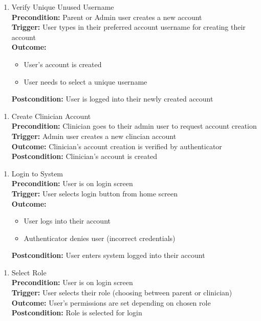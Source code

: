 \documentclass[12pt]{article}
\begin{document}
\begin{enumerate}[label={PUC-}02. ]
  \item Verify Unique Unused Username\\
  \textbf{Precondition: }Parent or Admin user creates a new account\\
  \textbf{Trigger: }User types in their preferred account username for creating their account\\
  \textbf{Outcome: }
  \begin{itemize}
  \item User's account is created
  \item User needs to select a unique username
  \end{itemize}
  \textbf{Postcondition: }User is logged into their newly created account\\
\end{enumerate}

\begin{enumerate}[label={PUC-}03. ]
  \item Create Clinician Account\\
  \textbf{Precondition: }Clinician goes to their admin user to request account creation\\
  \textbf{Trigger: }Admin user creates a new clincian account\\
  \textbf{Outcome: }Clinician's account creation is verified by authenticator\\
  \textbf{Postcondition: }Clinician's account is created\\
\end{enumerate}

\begin{enumerate}[label={PUC-}04. ]
  \item Login to System\\
  \textbf{Precondition: }User is on login screen\\
  \textbf{Trigger: }User selects login button from home screen\\
  \textbf{Outcome: }
  \begin{itemize}
    \item User logs into their account
    \item Authenticator denies user (incorrect credentials)
  \end{itemize}
  \textbf{Postcondition: }User enters system logged into their account\\
\end{enumerate}

\begin{enumerate}[label={PUC-}05. ]
  \item Select Role\\
  \textbf{Precondition: }User is on login screen\\
  \textbf{Trigger: }User selects their role (choosing between parent or clinician)\\
  \textbf{Outcome: }User's permissions are set depending on chosen role\\
  \textbf{Postcondition: }Role is selected for login\\
\end{enumerate}
\end{document}
